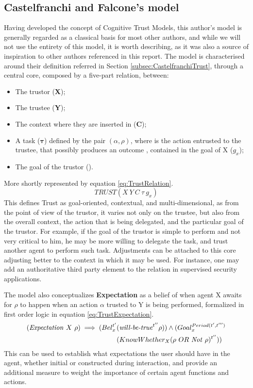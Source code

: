 \subsection{Castelfranchi and Falcone's model}
\label{subsec:Related work:Trust Models:Castelfranchi and Falcone}
Having developed the concept of Cognitive Trust Models, this author's model is generally regarded as a classical basis for most other authors, and while we will not use the entirety of this model, it is worth describing, as it was also a source of inspiration to other authors referenced in this report. 
The model is characterised around their definition referred in Section \ref{subsec:CastelfranchiTrust}, through a central core, composed by a five-part relation, between:
\begin{itemize}
    \item The trustor (\textbf{X});
    \item The trustee (\textbf{Y});
    \item The context where they are inserted in (\textbf{C});
    \item A task ($\bm{\tau}$) defined by the pair $(\alpha, \rho)$, where \bm{$\alpha$} is the action  entrusted to the trustee, that possibly produces an outcome \bm{$\rho$}, contained in the goal of X ($g_x$);
    \item The goal of the trustor ().
\end{itemize}
More shortly represented by equation \ref{eq:TrustRelation}.
\begin{equation}
TRUST(X\ Y\ C\ \tau\ g_x)
\label{eq:TrustRelation}
\end{equation}
This defines Trust as goal-oriented, contextual, and multi-dimensional, as from the point of view of the trustor, it varies not only on the trustee, but also from the overall context, the action that is being delegated, and the particular goal of the trustor. For example, if the goal of the trustor is simple to perform and not very critical to him, he may be more willing to delegate the task, and trust another agent to perform such task. Adjustments can be attached to this core adjusting better to the context in which it may be used. For instance, one may add an authoritative third party element to the relation in supervised security applications.

The model also conceptualizes \textbf{Expectation} as a belief of when agent X awaits for $\rho$ to happen when an action $\alpha$ trusted to Y is being performed, formalized in first order logic in equation \ref{eq:TrustExpectation}.
\begin{equation}
\begin{aligned}
(\text{\textit{Expectation}}\ X\ \rho) \implies (Bel_x^{t'} &(\text{\textit{will-be-true}} ^ {t''} \rho)) \wedge (Goal_x^{Period(t', t''')} \\
&(KnowWhether_X (\rho\ OR\ \text{\textit{Not} } \rho)^{t''}))
\end{aligned}
\label{eq:TrustExpectation}
\end{equation}
This can be used to establish what expectations the user should have in the agent, whether initial or constructed during interaction, and provide an additional measure to weight the importance of certain agent functions and actions.

